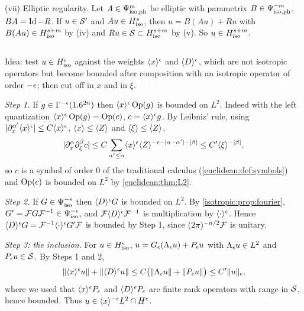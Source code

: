 (vii) Elliptic regularity. Let $A\in\Psi^{m}_{\mathrm{iso,ph}}$ be elliptic with parametrix $B\in\Psi^{-m}_{\mathrm{iso,ph}}$,
$BA=\operatorname{Id}-R$. If $u\in\mathcal{S}'$ and $Au\in H^{s}_{\mathrm{iso}}$, then $u=B(Au)+Ru$ with
$B(Au)\in H^{s+m}_{\mathrm{iso}}$ by (iv) and $Ru\in\mathcal{S}\subset H^{s+m}_{\mathrm{iso}}$ by (v). So
$u\in H^{s+m}_{\mathrm{iso}}$.

\subsection*{}
Idea: test $u\in H^{\epsilon}_{\mathrm{iso}}$ against the weights $\langle x\rangle^\epsilon$ and $\langle D\rangle^\epsilon$, which are
not isotropic operators but become bounded after composition with an isotropic operator of order
$-\epsilon$; then cut off in $x$ and in $\xi$.

\emph{Step 1.} If $g\in\Gamma^{-\epsilon}(1.6^{2n})$ then $\langle x\rangle^\epsilon\operatorname{Op}(g)$ is bounded on $L^2$. Indeed with
the left quantization $\langle x\rangle^\epsilon\operatorname{Op}(g)=\operatorname{Op}(c)$, $c=\langle x\rangle^\epsilon g$. By Leibniz' rule, using
$|\partial_x^{\alpha'}\langle x\rangle^\epsilon|\le C\langle x\rangle^\epsilon$, $\langle x\rangle\le\langle Z\rangle$ and $\langle \xi\rangle\le\langle Z\rangle$,
\begin{equation*}
  |\partial_x^\alpha\partial_\xi^\beta c|\le C\sum_{\alpha'\le\alpha}\langle x\rangle^\epsilon\langle Z\rangle^{-\epsilon-|\alpha-\alpha'|-|\beta|}
  \le C'\langle \xi\rangle^{-|\beta|},
\end{equation*}
so $c$ is a symbol of order $0$ of the traditional calculus (\cref{euclidean:def:symbols}) and
$\operatorname{Op}(c)$ is bounded on $L^2$ by \cref{euclidean:thm:L2}.

\emph{Step 2.} If $G\in\Psi^{-\epsilon}_{\mathrm{iso}}$ then $\langle D\rangle^\epsilon G$ is bounded on $L^2$. By
\cref{isotropic:prop:fourier}, $G'=\mathcal{F} G\mathcal{F}^{-1}\in\Psi^{-\epsilon}_{\mathrm{iso}}$, and
$\mathcal{F}\langle D\rangle^\epsilon\mathcal{F}^{-1}$ is multiplication by $\langle \cdot\rangle^\epsilon$. Hence
$\langle D\rangle^\epsilon G=\mathcal{F}^{-1}\langle \cdot\rangle^\epsilon G'\mathcal{F}$ is bounded by Step 1, since $(2\pi)^{-n/2}\mathcal{F}$ is
unitary.

\emph{Step 3: the inclusion.} For $u\in H^{\epsilon}_{\mathrm{iso}}$, $u=G_\epsilon(\Lambda_\epsilon u)+P_\epsilon u$
with $\Lambda_\epsilon u\in L^2$ and $P_\epsilon u\in\mathcal{S}$. By Steps 1 and 2,
\begin{equation}\label{soldeterminants:eq:weights}
  \lVert \langle x\rangle^\epsilon u\rVert+\lVert \langle D\rangle^\epsilon u\rVert\le C\bigl(\lVert \Lambda_\epsilon u\rVert+\lVert P_\epsilon u\rVert\bigr)\le C'\lVert u\rVert_\epsilon,
\end{equation}
where we used that $\langle x\rangle^\epsilon P_\epsilon$ and $\langle D\rangle^\epsilon P_\epsilon$ are finite rank operators with range
in $\mathcal{S}$, hence bounded. Thus $u\in\langle x\rangle^{-\epsilon}L^2\cap H^{\epsilon}$.

